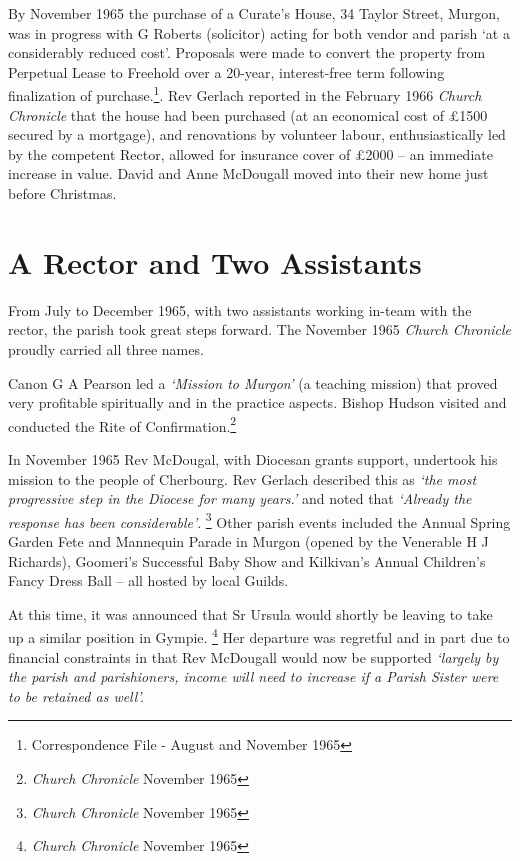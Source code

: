 By November 1965 the purchase of a Curate's House, 34 Taylor Street, Murgon, was in progress with G Roberts (solicitor) acting for both vendor and parish `at a considerably reduced cost'. Proposals were made to convert the property from Perpetual Lease to Freehold over a 20-year, interest-free term following finalization of purchase.\footnote{Correspondence File - August and November 1965}. Rev Gerlach reported in the February 1966 \emph{Church Chronicle} that the house had been purchased (at an economical cost of \pounds1500 secured by a mortgage), and renovations by volunteer labour, enthusiastically led by the competent Rector, allowed for insurance cover of \pounds2000 -- an immediate increase in value. David and Anne McDougall moved into their new home just before Christmas.


\section{A Rector and Two Assistants}



From July to December 1965, with two assistants working in-team with the rector, the parish took great steps forward. The November 1965 \emph{Church Chronicle} proudly carried all three names.



Canon G A Pearson led a \emph{`Mission to Murgon'} (a teaching mission) that proved very profitable spiritually and in the practice aspects. Bishop Hudson visited and conducted the Rite of Confirmation.\footnote{\emph{Church Chronicle} November 1965}


In November 1965 Rev McDougal, with Diocesan grants support, undertook his mission to the people of Cherbourg. Rev Gerlach described this as \emph{`the most progressive step in the Diocese for many years.'} and noted that \emph{`Already the response has been considerable'}. \footnote{\emph{Church Chronicle} November 1965} Other parish events included the Annual Spring Garden Fete and Mannequin Parade in Murgon (opened by the Venerable H J Richards), Goomeri's Successful Baby Show and Kilkivan's Annual Children's Fancy Dress Ball -- all hosted by local Guilds.


At this time, it was announced that Sr Ursula would shortly be leaving to take up a similar position in Gympie. \footnote{\emph{Church Chronicle} November 1965} Her departure was regretful and in part due to financial constraints in that Rev McDougall would now be supported \emph{`largely by the parish and parishioners, income will need to increase if a Parish Sister were to be retained as well'.}


